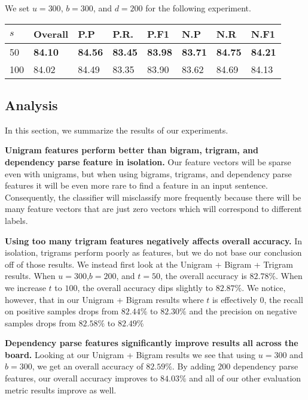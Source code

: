\documentclass{acm_proc_article-sp}
\begin{document}
We set $u = 300$, $b = 300$, and $d = 200$ for the following experiment.
\vspace{-3mm}
\tabcolsep=0.11cm
\begin{tabular}{| l | l | l | l | l | l | l | l |}
\hline
$s$ & Overall & P.P & P.R. & P.F1 & N.P & N.R & N.F1 \\ \hline
50 & \bf{84.10} & \bf{84.56} & \bf{83.45} & \bf{83.98} & \bf{83.71} & \bf{84.75} & \bf{84.21} \\ \hline
100 & 84.02 & 84.49 & 83.35 & 83.90 & 83.62 & 84.69 & 84.13 \\ \hline
\end{tabular} 
\subsection{Analysis}

In this section, we summarize the results of our experiments.

\textbf{Unigram features perform better than bigram, trigram, and dependency parse feature in isolation.} 
Our feature vectors will be sparse even with unigrams, but when using bigrams, trigrams, and dependency parse features it will be even more rare to find a feature in an input sentence. Consequently, the classifier will misclassify more frequently because there will be many feature vectors that are just zero vectors which will correspond to different labels.

\textbf{Using too many trigram features negatively affects overall accuracy.} In isolation, trigrams perform poorly as features, but we do not base our conclusion off of those results. We instead first look at the Unigram + Bigram + Trigram results. When $u=300$,$b=200$, and $t=50$, the overall accuracy is $82.78\%$. When we increase $t$ to $100$, the overall accuracy dips slightly to $82.87\%$. We notice, however, that in our Unigram + Bigram results where $t$ is effectively $0$, the recall on positive samples drops from $82.44\%$ to $82.30\%$ and the precision on negative samples drops from $82.58\%$ to $82.49\%$

\textbf{Dependency parse features significantly improve results all across the board.} Looking at our Unigram + Bigram results we see that using $u=300$ and $b=300$, we get an overall accuracy of $82.59\%$. By adding $200$ dependency parse features, our overall accuracy improves to $84.03\%$ and all of our other evaluation metric results improve as well. 
\end{document}
